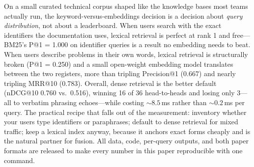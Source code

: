 \documentclass[11pt,a4paper]{article}
\begin{document}
On a small curated technical corpus shaped like the knowledge bases most teams actually run, the keyword-versus-embeddings decision is a decision about \emph{query distribution}, not about a leaderboard. When users search with the exact identifiers the documentation uses, lexical retrieval is perfect at rank 1 and free---BM25's P@1 = 1.000 on identifier queries is a result no embedding needs to beat. When users describe problems in their own words, lexical retrieval is structurally broken (P@1 = 0.250) and a small open-weight embedding model translates between the two registers, more than tripling Precision@1 (0.667) and nearly tripling MRR@10 (0.783). Overall, dense retrieval is the better default (nDCG@10 0.760 vs.\ 0.516), winning 16 of 36 head-to-heads and losing only 3---all to verbatim phrasing echoes---while costing ${\sim}8.5$\,ms rather than ${\sim}0.2$\,ms per query. The practical recipe that falls out of the measurement: inventory whether your users type identifiers or paraphrases; default to dense retrieval for mixed traffic; keep a lexical index anyway, because it anchors exact forms cheaply and is the natural partner for fusion. All data, code, per-query outputs, and both paper formats are released to make every number in this paper reproducible with one command.
\end{document}
